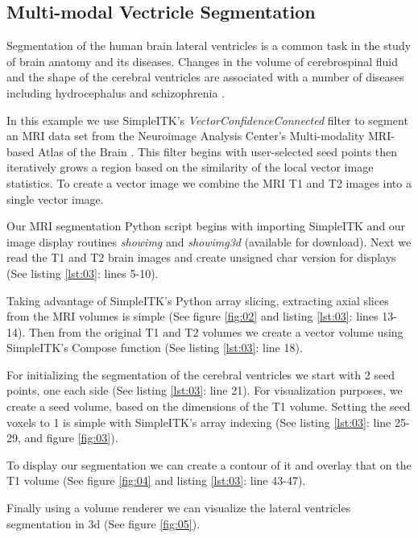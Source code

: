 \documentclass{frontiersMED} %
\begin{document}
\subsection{Multi-modal Vectricle Segmentation}
Segmentation of the human brain lateral ventricles is a common task in the
study of brain anatomy and its diseases.  Changes in the volume of
cerebrospinal fluid and the shape of the cerebral ventricles are
associated with a number of diseases including hydrocephalus
\cite{Brandt1994} and schizophrenia \cite{Staal2000}.

In this example we use SimpleITK's \textit{VectorConfidenceConnected} filter
\cite{Ibanez2005} to segment an MRI data set from the Neuroimage Analysis
Center's Multi-modality MRI-based Atlas of the Brain \cite{Halle2013}.
This filter begins with user-selected seed points then iteratively
grows a region based on the similarity of the local vector image
statistics. To create a vector image we combine the MRI T1 and T2
images into a single vector image.

Our MRI segmentation Python script begins with importing SimpleITK and
our image display routines \textit{showimg} and \textit{showimg3d} (available for
download).  Next we read the T1 and T2 brain images and create unsigned char
version for displays (See listing \ref{lst:03}: lines 5-10).

Taking advantage of SimpleITK's Python array slicing, extracting
axial slices from the MRI volumes is simple (See figure \ref{fig:02}
and listing \ref{lst:03}: lines 13-14). Then from the original T1 and T2 volumes we
create a vector volume using SimpleITK's Compose function (See listing \ref{lst:03}: line 18).

For initializing the segmentation of the cerebral ventricles  we start with
2 seed points, one each side (See listing \ref{lst:03}: line 21).
For visualization purposes, we create
a seed volume, based on the dimensions of the T1 volume.  Setting the
seed voxels to 1 is simple with SimpleITK's array indexing (See listing
\ref{lst:03}: line 25-29, and figure \ref{fig:03}).

To display our segmentation we can create a contour of it and overlay
that on the T1 volume (See figure \ref{fig:04} and listing
\ref{lst:03}: line 43-47).

Finally using a volume renderer we can visualize the lateral ventricles
segmentation in 3d (See figure \ref{fig:05}).


\end{document}
